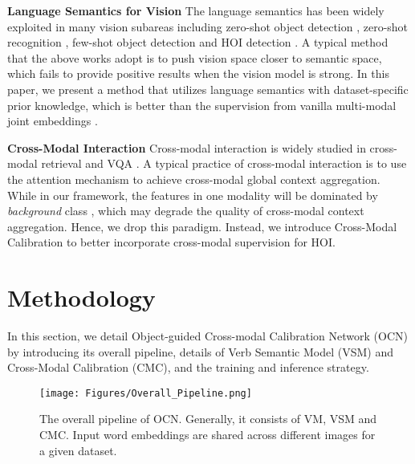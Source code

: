 \documentclass[letterpaper]{article} %
\begin{document}
\noindent\textbf{Language Semantics for Vision} The language semantics has been widely exploited in many vision subareas including zero-shot object detection \cite{bansal2018ZSOD}, zero-shot recognition \cite{wang2018ZSRsemantic}, few-shot object detection \cite{zhu2021semanticrelation} and HOI detection \cite{peyre2019HOIwithanalogy,xu2019HOIwithknowledge}. A typical method that the above works adopt is to push vision space closer to semantic space, which fails to provide positive results when the vision model is strong. In this paper, we present a method that utilizes language semantics with dataset-specific prior knowledge, which is better than the supervision from vanilla multi-modal joint embeddings \cite{xu2019HOIwithknowledge}. 




\noindent\textbf{Cross-Modal Interaction} Cross-modal interaction is widely studied in cross-modal retrieval \cite{wang2019camp,liu2019referring_grounding} and VQA \cite{Gao2019DynamicInterIntra,jiang2020videoQA}. A typical practice of cross-modal interaction is to use the attention mechanism \cite{AttentionAlluNeed} to achieve cross-modal global context aggregation. While in our framework, the features in one modality will be dominated by \textit{background} class \cite{carion2020DETR}, which may degrade the quality of cross-modal context aggregation. Hence, we drop this paradigm. Instead, we introduce Cross-Modal Calibration to better incorporate cross-modal supervision for HOI. 



\section{Methodology}
In this section, we detail Object-guided Cross-modal Calibration Network (OCN) by introducing its overall pipeline, details of Verb Semantic Model (VSM) and Cross-Modal Calibration (CMC), and the training and inference strategy.

\begin{figure*}[t]
\centering
\texttt{[image: Figures/Overall\_Pipeline.png]} 
\caption{The overall pipeline of OCN. Generally, it consists of VM, VSM and CMC. Input word embeddings are shared across different images for a given dataset.}
\label{Overall_pipeline}
\end{figure*}
\end{document}
